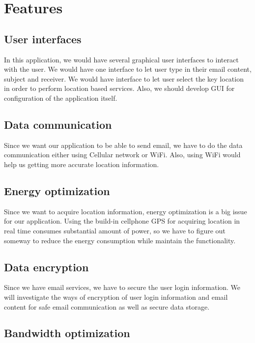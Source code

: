 \documentclass[a4paper,12pt]{article}
\begin{document}
	
	\section{Features}
	\subsection{User interfaces}
	
	In this application, we would have several graphical user interfaces to interact with the user. We would have one interface to let user type in their email content, subject and receiver. We would have interface to let user select the key location in order to perform location based services. Also, we should develop GUI for configuration of the application itself.
	
	\subsection{Data communication}
	
	Since we want our application to be able to send email, we have to do the data communication either using Cellular network or WiFi. Also, using WiFi would help us getting more accurate location information.
	
	\subsection{Energy optimization}
	
	Since we want to acquire location information, energy optimization is a big issue for our application. Using the build-in cellphone GPS for acquiring location in real time consumes substantial amount of power, so we have to figure out someway to reduce the energy consumption while maintain the functionality.
	
	\subsection{Data encryption}
	
	Since we have email services, we have to secure the user login information. We will investigate the ways of encryption of user login information and email content for safe email communication as well as secure data storage.
	
	\subsection{Bandwidth optimization}
	
	
	
	
	
	
	
	
	
\end{document}
